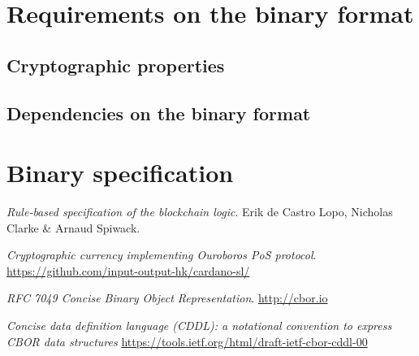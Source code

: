 \documentclass{article}
\begin{document}
\section{Requirements on the binary format}
\label{sec:reqs}

\subsection{Cryptographic properties}

\subsection{Dependencies on the binary format}

\section{Binary specification}
\label{sec:binfmt}

\begin{thebibliography}{9}
  \textit{Rule-based specification of the blockchain logic}.
  Erik de Castro Lopo, Nicholas Clarke \& Arnaud Spiwack.

  \textit{Cryptographic currency implementing Ouroboros PoS protocol}.
  \url{https://github.com/input-output-hk/cardano-sl/}

  \textit{RFC 7049 Concise Binary Object Representation}.
  \url{http://cbor.io}

  \textit{Concise data definition language (CDDL): a notational
    convention to express CBOR data structures}
  \url{https://tools.ietf.org/html/draft-ietf-cbor-cddl-00}

\end{thebibliography}
\end{document}
